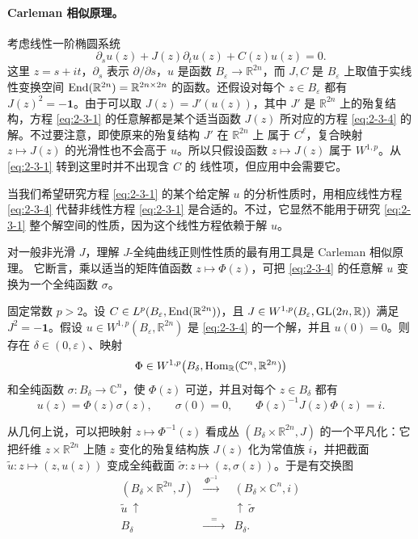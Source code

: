 \paragraph{Carleman 相似原理。}
考虑线性一阶椭圆系统
\begin{equation}\label{eq:2-3-4}
  \partial_su(z)+J(z)\partial_tu(z)+C(z)u(z)=0.
\end{equation}
这里 $z=s+it$，$\partial_s$ 表示 $\partial/\partial s$，$u$ 是函数
$B_\varepsilon\to\mathbb R^{2n}$，而 $J,C$ 是 $B_\varepsilon$ 上取值于实线性变换空间
$\operatorname{End}(\mathbb R^{2n})=\mathbb R^{2n\times2n}$ 的函数。还假设对每个
$z\in B_\varepsilon$ 都有 $J(z)^2=-\mathbf1$。由于可以取
$J(z)=J'(u(z))$，其中 $J'$ 是 $\mathbb R^{2n}$ 上的殆复结构，方程
\eqref{eq:2-3-1} 的任意解都是某个适当函数 $J(z)$ 所对应的方程
\eqref{eq:2-3-4} 的解。不过要注意，即使原来的殆复结构 $J'$ 在 $\mathbb R^{2n}$ 上
属于 $C^\ell$，复合映射 $z\mapsto J(z)$ 的光滑性也不会高于 $u$。所以只假设函数
$z\mapsto J(z)$ 属于 $W^{1,p}$。从 \eqref{eq:2-3-1} 转到这里时并不出现含 $C$ 的
线性项，但应用中会需要它。

当我们希望研究方程 \eqref{eq:2-3-1} 的某个给定解 $u$ 的分析性质时，用相应线性方程
\eqref{eq:2-3-4} 代替非线性方程 \eqref{eq:2-3-1} 是合适的。不过，它显然不能用于研究
\eqref{eq:2-3-1} 整个解空间的性质，因为这个线性方程依赖于解 $u$。

对一般非光滑 $J$，理解 $J$-全纯曲线正则性性质的最有用工具是 Carleman 相似原理。
它断言，乘以适当的矩阵值函数 $z\mapsto\Phi(z)$，可把 \eqref{eq:2-3-4} 的任意解 $u$
变换为一个全纯函数 $\sigma$。

\begin{theorem}\label{thm:2-3-5}
固定常数 $p>2$。设
$C\in L^p(B_\varepsilon,\operatorname{End}(\mathbb R^{2n}))$，且
$J\in W^{1,p}(B_\varepsilon,\operatorname{GL}(2n,\mathbb R))$ 满足 $J^2=-\mathbf1$。假设
$u\in W^{1,p}(B_\varepsilon,\mathbb R^{2n})$ 是 \eqref{eq:2-3-4} 的一个解，并且
$u(0)=0$。则存在 $\delta\in(0,\varepsilon)$、映射
\[
  \Phi\in W^{1,p}\bigl(B_\delta,\operatorname{Hom}_{\mathbb R}(\mathbb C^n,\mathbb R^{2n})\bigr)
\]
和全纯函数 $\sigma:B_\delta\to\mathbb C^n$，使 $\Phi(z)$ 可逆，并且对每个
$z\in B_\delta$ 都有
\[
  u(z)=\Phi(z)\sigma(z),
  \qquad \sigma(0)=0,
  \qquad \Phi(z)^{-1}J(z)\Phi(z)=i.
\]
\end{theorem}

从几何上说，可以把映射 $z\mapsto\Phi^{-1}(z)$ 看成丛
$(B_\delta\times\mathbb R^{2n},J)$ 的一个平凡化：它把纤维
$z\times\mathbb R^{2n}$ 上随 $z$ 变化的殆复结构族 $J(z)$ 化为常值族 $i$，并把截面
$\widetilde u:z\mapsto(z,u(z))$ 变成全纯截面
$\widetilde\sigma:z\mapsto(z,\sigma(z))$。于是有交换图
\[
\begin{array}{ccc}
  (B_\delta\times\mathbb R^{2n},J)
  &\xrightarrow{\ \Phi^{-1}\ }&(B_\delta\times\mathbb C^n,i)\\[2pt]
  \widetilde u\ \uparrow&&\uparrow\ \widetilde\sigma\\[-1pt]
  B_\delta&\xrightarrow{\quad=\quad}&B_\delta.
\end{array}
\]

